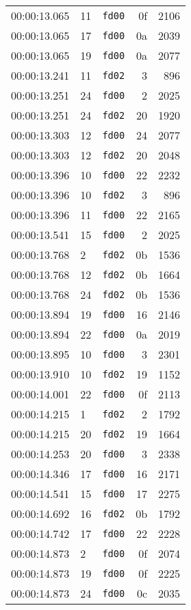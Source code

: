 \documentclass{article}
\begin{document}
\begin{longtable}{lllrr}
00:00:13.065 & 11 & \texttt{fd00} & 0f & 2106 \\
00:00:13.065 & 17 & \texttt{fd00} & 0a & 2039 \\
00:00:13.065 & 19 & \texttt{fd00} & 0a & 2077 \\
00:00:13.241 & 11 & \texttt{fd02} & 3 & 896 \\
00:00:13.251 & 24 & \texttt{fd00} & 2 & 2025 \\
00:00:13.251 & 24 & \texttt{fd02} & 20 & 1920 \\
00:00:13.303 & 12 & \texttt{fd00} & 24 & 2077 \\
00:00:13.303 & 12 & \texttt{fd02} & 20 & 2048 \\
00:00:13.396 & 10 & \texttt{fd00} & 22 & 2232 \\
00:00:13.396 & 10 & \texttt{fd02} & 3 & 896 \\
00:00:13.396 & 11 & \texttt{fd00} & 22 & 2165 \\
00:00:13.541 & 15 & \texttt{fd00} & 2 & 2025 \\
00:00:13.768 & 2 & \texttt{fd02} & 0b & 1536 \\
00:00:13.768 & 12 & \texttt{fd02} & 0b & 1664 \\
00:00:13.768 & 24 & \texttt{fd02} & 0b & 1536 \\
00:00:13.894 & 19 & \texttt{fd00} & 16 & 2146 \\
00:00:13.894 & 22 & \texttt{fd00} & 0a & 2019 \\
00:00:13.895 & 10 & \texttt{fd00} & 3 & 2301 \\
00:00:13.910 & 10 & \texttt{fd02} & 19 & 1152 \\
00:00:14.001 & 22 & \texttt{fd00} & 0f & 2113 \\
00:00:14.215 & 1 & \texttt{fd02} & 2 & 1792 \\
00:00:14.215 & 20 & \texttt{fd02} & 19 & 1664 \\
00:00:14.253 & 20 & \texttt{fd00} & 3 & 2338 \\
00:00:14.346 & 17 & \texttt{fd00} & 16 & 2171 \\
00:00:14.541 & 15 & \texttt{fd00} & 17 & 2275 \\
00:00:14.692 & 16 & \texttt{fd02} & 0b & 1792 \\
00:00:14.742 & 17 & \texttt{fd00} & 22 & 2228 \\
00:00:14.873 & 2 & \texttt{fd00} & 0f & 2074 \\
00:00:14.873 & 19 & \texttt{fd00} & 0f & 2225 \\
00:00:14.873 & 24 & \texttt{fd00} & 0c & 2035 \\

\end{longtable}
\end{document}
